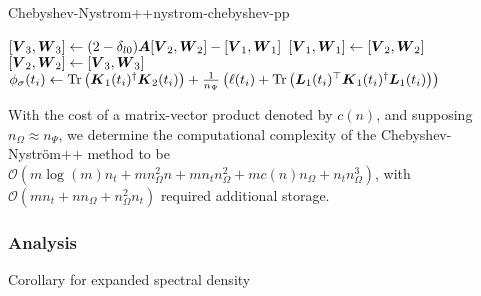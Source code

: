 \documentclass[12pt]{article}
\begin{document}
\begin{algo}{Chebyshev-Nystrom++}{nystrom-chebyshev-pp}
\begin{algorithmic}[1]
      \EndFor
      \State $[\boldsymbol{V}_3, \boldsymbol{W}_3] \gets (2 - \delta_{l0}) \boldsymbol{A} [\boldsymbol{V}_2, \boldsymbol{W}_2] - [\boldsymbol{V}_1, \boldsymbol{W}_1]$ 
      \State $[\boldsymbol{V}_1, \boldsymbol{W}_1] \gets [\boldsymbol{V}_2, \boldsymbol{W}_2]$
      \State $[\boldsymbol{V}_2, \boldsymbol{W}_2] \gets [\boldsymbol{V}_3, \boldsymbol{W}_3]$
    \EndFor
      \State $\phi_{\sigma}(t_i) \gets \operatorname{Tr}\left( \boldsymbol{K}_1(t_i)^{\dagger}\boldsymbol{K}_2(t_i) \right) + \frac{1}{n_{\Psi}} \left( \ell(t_i) + \operatorname{Tr}\left( \boldsymbol{L}_1(t_i)^{\top} \boldsymbol{K}_1(t_i)^{\dagger} \boldsymbol{L}_1(t_i) \right)  \right) $ \label{lin:4-nystromchebyshev-nystrom-pp}
    \EndFor
\end{algorithmic}
\end{algo}

With the cost of a matrix-vector product denoted by $c(n)$, and supposing $n_{\Omega} \approx n_{\Psi}$, we determine the computational complexity of the Chebyshev-Nyström++ method to be $\mathcal{O}(m \log(m) n_t + m n_{\Omega}^2 n + m n_t n_{\Omega}^2 +  m c(n) n_{\Omega} + n_t n_{\Omega}^3)$, with $\mathcal{O}(m n_t + n n_{\Omega} + n_{\Omega}^2 n_t)$ required additional storage.




\subsubsection{Analysis}
\label{subsubsec:chebyshev-nystrom-analysis}

Corollary for expanded spectral density
\end{document}
